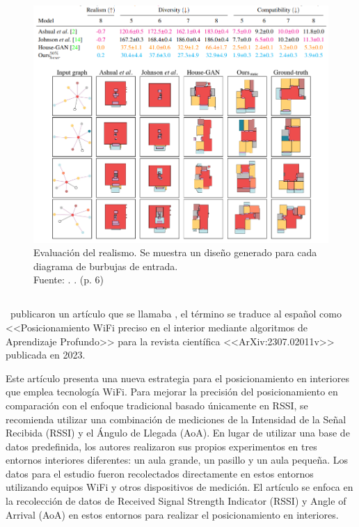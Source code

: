 \begin{figure}[!ht]
	\begin{center}
		\includegraphics[width=1.1\textwidth]{2/figures/nauata2021_2.png}
		\caption[Evaluación del realismo. Se muestra un diseño generado para cada diagrama de burbujas de entrada]{Evaluación del realismo. Se muestra un diseño generado para cada diagrama de burbujas de entrada.\\
			Fuente: \cite{pr_nauata2021housegan}. . (p. 6)}
		\label{2:fig116}
	\end{center}
\end{figure}

\subsection{}
\cite{pr_cai2023precisewifi} publicaron un artículo que se llamaba , el término se traduce al español como <<Posicionamiento WiFi preciso en el interior mediante algoritmos de Aprendizaje Profundo>> para la revista científica <<ArXiv:2307.02011v>> publicada en 2023.

Este artículo presenta una nueva estrategia para el posicionamiento en interiores que emplea tecnología WiFi. Para mejorar la precisión del posicionamiento en comparación con el enfoque tradicional basado únicamente en RSSI, se recomienda utilizar una combinación de mediciones de la Intensidad de la Señal Recibida (RSSI) y el Ángulo de Llegada (AoA). En lugar de utilizar una base de datos predefinida, los autores realizaron sus propios experimentos en tres entornos interiores diferentes: un aula grande, un pasillo y un aula pequeña. Los datos para el estudio fueron recolectados directamente en estos entornos utilizando equipos WiFi y otros dispositivos de medición. El artículo se enfoca en la recolección de datos de Received Signal Strength Indicator (RSSI) y Angle of Arrival (AoA) en estos entornos para realizar el posicionamiento en interiores.

